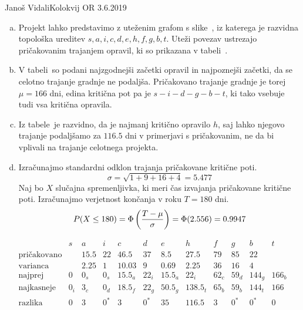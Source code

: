 \begin{naloga}{Janoš Vidali}{Kolokvij OR 3.6.2019}
\begin{odgovor}
\begin{enumerate}[(a)]
\item Projekt lahko predstavimo z uteženim grafom s slike~\fig,
iz katerega je razvidna topološka ureditev $s, a, i, c, d, e, h, f, g, b, t$.
Uteži povezav ustrezajo pričakovanim trajanjem opravil,
ki so prikazana v tabeli~.

\item V tabeli~
so podani najzgodnejši začetki opravil in najpoznejši začetki,
da se celotno trajanje gradnje ne podaljša.
Pričakovano trajanje gradnje je torej $\mu = 166$ dni,
edina kritična pot pa je $s - i - d - g - b - t$,
ki tako vsebuje tudi vsa kritična opravila.

\item Iz tabele~ je razvidno,
da je najmanj kritično opravilo $h$,
saj lahko njegovo trajanje
podaljšamo za $116.5$ dni v primerjavi s pričakovanim,
ne da bi vplivali na trajanje celotnega projekta.

\item Izračunajmo standardni odklon trajanja pričakovane kritične poti.
$$
\sigma = \sqrt{1 + 9 + 16 + 4} = 5.477
$$
Naj bo $X$ slučajna spremenljivka,
ki meri čas izvajanja pričakovane kritične poti.
Izračunajmo verjetnost končanja v roku $T = 180$ dni.
$$
P(X \le 180) = \Phi\left({T - \mu \over \sigma}\right) = \Phi(2.556) = 0.9947
$$
\end{enumerate}
%
\begin{slika}
\makebox[\textwidth][c]{
\pgfslika
}
\end{slika}
%
\begin{tabela}
$$
\begin{array}{c|ccccccccccc}
& s & a & i & c & d & e & h & f & g & b & t \\ \hline
\text{pričakovano} && 15.5 & 22 & 46.5 & 37 & 8.5 & 27.5 & 79 & 85 & 22 \\
\text{varianca} && 2.25 & 1 & 10.03 & 9 & 0.69 & 2.25 & 36 & 16 & 4 \\
\hline
\text{najprej} & 0 & 0_s & 0_s & 15.5_a & 22_i & 15.5_a & 22_i & 62_c & 59_d & 144_g & 166_b \\
\text{najkasneje} & 0_i & 3_c & 0_d & 18.5_f & 22_g & 50.5_g & 138.5_t & 65_b & 59_b & 144_t & 166 \\
\text{razlika} & 0 & 3 & 0^* & 3 & 0^* & 35 & 116.5 & 3 & 0^* & 0^* & 0
\end{array}
$$
\end{tabela}
\end{odgovor}
\end{naloga}
